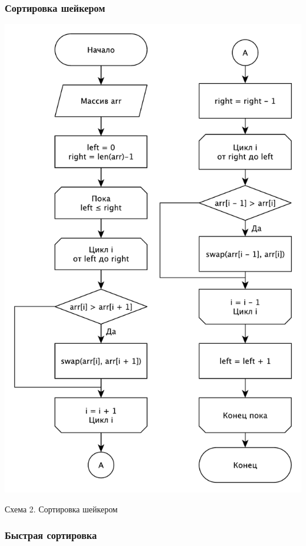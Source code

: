 \documentclass[a4paper,12pt]{article}
\begin{document}
\subsubsection{Сортировка шейкером}

\begin{center}
    \includegraphics[scale=0.97]{Shaker}

    Схема 2. Сортировка шейкером
\end{center}

\subsubsection{Быстрая сортировка}
\end{document}
